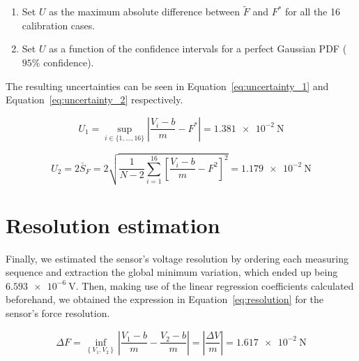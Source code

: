 \documentclass[12pt]{article}
\begin{document}
        \begin{enumerate}
                \item Set \( U \) as the maximum absolute difference between \( \widetilde{F} \) and \( F^{*} \) for all the 16 calibration cases.
                \item Set \( U \) as a function of the confidence intervals for a perfect Gaussian PDF (\( 95\% \) confidence).
        \end{enumerate}

        The resulting uncertainties can be seen in Equation~\ref{eq:uncertainty_1} and Equation~\ref{eq:uncertainty_2} respectively.

        \begin{equation} \label{eq:uncertainty_1}
                U_1 = \sup_{i \in \{1,...,16\}} \left| \frac{V_i - b}{m} - F^* \right| = \SI{1.381e-2}{\newton}
        \end{equation}

        \begin{equation} \label{eq:uncertainty_2}
                U_2 = 2 \bar{S}_F = 2 \sqrt{\frac{1}{N-2} \sum_{i = 1}^{16}{\left[\frac{V_i - b}{m} - F^2\right]^2}} = \SI{1.179e-2}{\newton}
        \end{equation}

\section{Resolution estimation} \label{sec:resolution}

        Finally, we estimated the sensor's voltage resolution by ordering each measuring sequence and extraction the global minimum variation, which ended up being \( \SI{6.593e-6}{\volt} \). Then, making use of the linear regression coefficients calculated beforehand, we obtained the expression in Equation~\ref{eq:resolution} for the sensor's force resolution.

        \begin{equation} \label{eq:resolution}
                \Delta F = \inf_{\left\{ V_1, V_2 \right\}} \left| \frac{V_1 - b}{m} - \frac{V_2 - b}{m} \right| = \left| \frac{\Delta V}{m} \right| = \SI{1.617e-2}{\newton}
        \end{equation}



\end{document}
